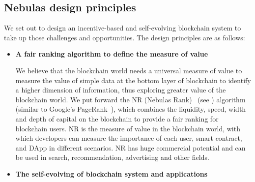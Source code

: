 \subsection{Nebulas design principles}
We set out to design an incentive-based and self-evolving blockchain system to take up those challenges and opportunities. The design principles are as follows:
\begin{itemize}
	\item \textbf{A fair ranking algorithm to define the measure of value}

We believe that the blockchain world needs a universal measure of value to measure the value of simple data at the bottom layer of blockchain to identify a higher dimension of information, thus exploring greater value of the blockchain world. We put forward the NR (Nebulas Rank) ~(see ) algorithm (similar to Google's PageRank~\cite{Brin2010}\cite{page1999pagerank}), which combines the liquidity, speed, width and depth of capital on the blockchain to provide a fair ranking for blockchain users. NR is the measure of value in the blockchain world, with which developers can measure the importance of each user, smart contract, and DApp in different scenarios. NR has huge commercial potential and can be used in search, recommendation, advertising and other fields.

\item \textbf{The self-evolving of blockchain system and applications}


\end{itemize}
